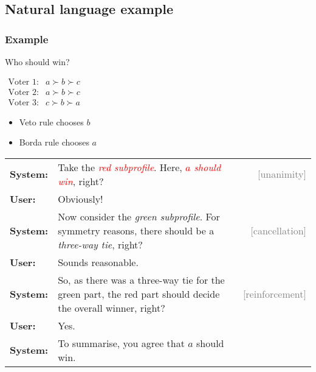 \documentclass[english]{beamer}
\begin{document}
\subsection{Natural language example}
\begin{frame}
	\frametitle{Example}
	
	\begin{block}{Who should win?}
		\begin{center}
			$\begin{array}{lc}
				\text{Voter 1:} & a\succ b\succ c \\
				\text{Voter 2:} & a\succ b\succ c \\
				\text{Voter 3:} & c\succ b\succ a 
			\end{array}$
		\end{center}
	\end{block}
	\begin{itemize}
		\item Veto rule chooses $b$
		\item Borda rule chooses $a$
	\end{itemize}
\end{frame}

\begin{frame}
	\begin{center}
	\end{center}
	
	\begin{tabular}{@{}lp{6.8cm}r@{}}
		\textbf{System:} & Take the \textcolor{red}{\textit{red subprofile}}. Here, \textcolor{red}{\textit{$a$ should win}}, right? & \textcolor{gray}{[unanimity]} \\
		\textbf{User:} & Obviously! & \\
		\textbf{System:} & Now consider the \emph{green subprofile}. For symmetry reasons, there should be a \emph{three-way tie}, right? & \textcolor{gray}{[cancellation]} \\
		\textbf{User:} & Sounds reasonable. & \\
		\textbf{System:} &  So, as there was a three-way tie for the green part, the red part should decide the overall winner, right? & \textcolor{gray}{[reinforcement]} \\
		\textbf{User:} & Yes. \\
		\textbf{System:} & To summarise, you agree that $a$ should win. 
	\end{tabular}
\end{frame}
\end{document}
